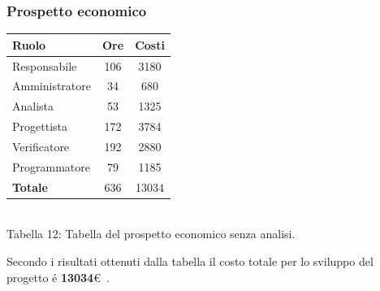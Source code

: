 \subsubsection{Prospetto economico}
\begin{center}
\begin{tabular}{| l | c | c |}
\hline
Ruolo & Ore & Costi \\
\hline
Responsabile & 106 & 3180 \\
Amministratore & 34 & 680 \\
Analista & 53 & 1325\\
Progettista & 172 & 3784 \\
Verificatore & 192 & 2880 \\
Programmatore & 79 & 1185 \\
\hline
\textbf{Totale} & 636 & 13034 \\
\hline
\end{tabular}
\\
Tabella 12: Tabella del prospetto economico senza analisi.
\end{center}
Secondo i risultati ottenuti dalla tabella il costo totale per lo sviluppo del progetto \'e \textbf{13034}\euro~.